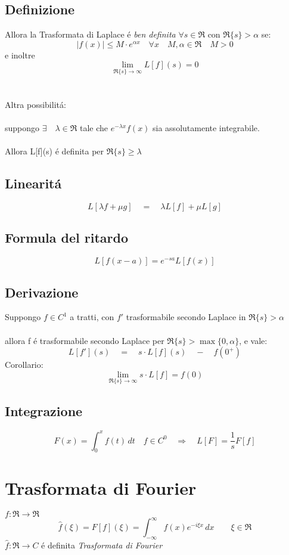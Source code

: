 \documentclass[a4paper,10pt,italian]{article}
\begin{document}
\subsection{Definizione}
Allora la Trasformata di Laplace \'e \emph{ben definita} $\forall s \in \Re$ con $\Re\{s\} > \alpha$ se:
$$\mid f(x) \mid \leq M\cdot e^{\alpha x} \quad \forall x \quad M,\alpha \in \Re \quad M>0$$ 
e inoltre $$\lim_{\Re\{s\}\rightarrow \infty}L[f](s)=0$$ \\ \\
Altra possibilit\'a: \\ \\
suppongo $\exists \quad \lambda \in \Re$ tale che $ e^{-\lambda x}f(x) $ sia assolutamente integrabile. \\ \\
Allora L[f](s) \'e definita per $\Re\{s\} \geq \lambda$

\subsection{Linearit\'a}
$$ L[\lambda f + \mu g] \quad = \quad \lambda L[f] + \mu L[g]$$

\subsection{Formula del ritardo}
$$ L[f(x-a)] = e^{-sa} L[f(x)]  $$

\subsection{Derivazione}
Suppongo $f \in C^1$ a tratti, con $f'$ trasformabile secondo Laplace in $\Re\{s\}>\alpha$ \\ \\
allora f \'e trasformabile secondo Laplace per $\Re\{s\} > \max\{0,\alpha\}$, e vale:
$$ L[f'](s) \quad = \quad s\cdot L[f](s) \quad - \quad f(0^+) $$
Corollario:
$$ \lim_{\Re\{s\}\rightarrow \infty} s\cdot L[f] = f(0)$$

\subsection{Integrazione}
$$ F(x) = \int_{0}^{x} f(t)\,dt \quad f\in C^0 \quad \Longrightarrow\quad L[F] = \frac{1}{s}F[f]$$

\section{Trasformata di Fourier}
$f:\Re \rightarrow \Re$
$$ \hat{f}(\xi) = F[f](\xi) = \int_{-\infty}^{\infty}f(x)e^{-i\xi x}\,dx \qquad \xi \in \Re$$
$\hat{f}:\Re \rightarrow C$ \'e definita \emph{Trasformata di Fourier}
\end{document}
